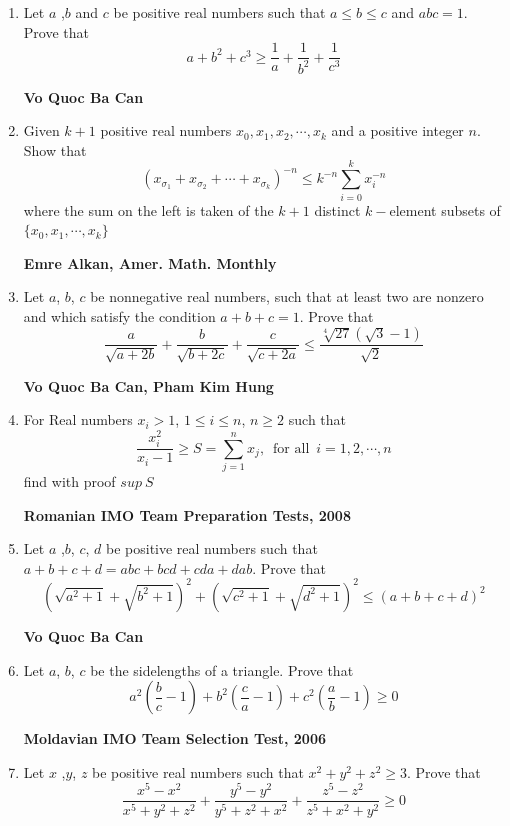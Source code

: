 \documentclass{article}
\begin{document}
\begin{enumerate}
\item Let $a$ ,$b$ and $c$ be positive real numbers such that $a\leq b\leq c$ and $abc=1$. Prove that$$a+b^2+c^3 \geq \frac{1}{a}+\frac{1}{b^2}+\frac{1}{c^3}$$
\begin{flushright}
	\textbf{Vo Quoc Ba Can}
\end{flushright}
\item Given $k+1$ positive real numbers $x_0,x_1,x_2,\cdots ,x_k$ and a positive integer $n$. Show that $$\left(x_{\sigma_1}+x_{\sigma_2}+\cdots+x_{\sigma_k}\right)^{-n}\leq k^{-n}\sum \limits_{i=0}^kx_i^{-n}$$where the sum on the left is taken of the $k + 1$ distinct $k-$element subsets of $\{x_0,x_1,\cdots,x_k\}$
\begin{flushright}
	\textbf{Emre Alkan, Amer. Math. Monthly}
\end{flushright}
\item Let $a$, $b$, $c$ be nonnegative real numbers, such that at least two are nonzero and which satisfy the condition $a + b + c = 1$. Prove that$$\frac{a}{\sqrt{a+2b}}+\frac{b}{\sqrt{b+2c}}+\frac{c}{\sqrt{c+2a}}\leq \frac{\sqrt[4]{27}\left(\sqrt{3}-1\right)}{\sqrt{2}}$$
\begin{flushright}
	\textbf{Vo Quoc Ba Can, Pham Kim Hung}
\end{flushright}
\item For Real numbers $x_i>1$, $1\leq i\leq n$, $n\geq 2$ such that $$\frac{x_i^2}{x_i-1}\geq S=\sum \limits_{j=1}^n x_j,\ \operatorname{for\  all}\ i=1,2,\cdots,n$$find with proof $sup\ S$
\begin{flushright}
	\textbf{Romanian IMO Team Preparation Tests, 2008}
\end{flushright}
\item Let $a$ ,$b$, $c$, $d$ be positive real numbers such that $a+b+c+d=abc+bcd+cda+dab$. Prove that $$\left(\sqrt{a^2+1}+\sqrt{b^2+1}\right)^2+\left(\sqrt{c^2+1}+\sqrt{d^2+1}\right)^2\leq (a+b+c+d)^2$$
\begin{flushright}
	\textbf{Vo Quoc Ba Can}
\end{flushright}
\item Let $a$, $b$, $c$ be the sidelengths of a triangle. Prove that $$a^2\left(\frac{b}{c}-1\right)+b^2\left(\frac{c}{a}-1\right)+c^2\left(\frac{a}{b}-1\right)\geq 0$$
\begin{flushright}
	\textbf{Moldavian IMO Team Selection Test, 2006}
\end{flushright}
\item Let $x$ ,$y$, $z$ be positive real numbers such that  $x^2+y^2+z^2\geq 3$. Prove that$$\frac{x^5-x^2}{x^5+y^2+z^2}+\frac{y^5-y^2}{y^5+z^2+x^2}+\frac{z^5-z^2}{z^5+x^2+y^2}\geq 0$$

\end{enumerate}
\end{document}
